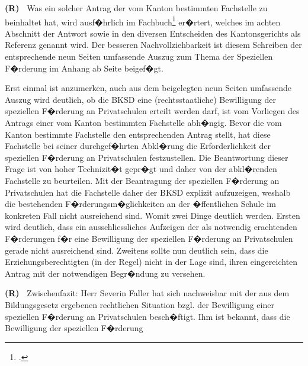 \documentclass[paper=a4,fontsize=12pt, oneside, numbers=noenddot]{scrbook}
\newcounter{rz}
\newcommand{\RzLabel}[1]{\refstepcounter{rz}\label{#1}\textbf{(R\arabic{rz})~}}
\begin{document}
	
	
	\RzLabel{InhaltAntrag} Was ein solcher Antrag der vom Kanton bestimmten Fachstelle zu beinhaltet hat, wird ausf�hrlich im Fachbuch\footcite[Seite 49]{2007:Biaggini:StaatsVerwaltungsrechBL} er�rtert, welches im achten Abschnitt der Antwort sowie in den diversen Entscheiden des Kantonsgerichts als Referenz genannt wird. Der besseren Nachvollziehbarkeit ist diesem Schreiben der entsprechende neun Seiten umfassende Auszug zum Thema der Speziellen F�rderung im Anhang ab Seite \pageref{AuszugVerwaltungsrechtII} beigef�gt. 
	
	
	Erst einmal ist anzumerken, auch aus dem beigelegten neun Seiten umfassende Auszug wird deutlich, ob die BKSD eine (rechtsstaatliche) Bewilligung der speziellen F�rderung an Privatschulen erteilt werden darf, ist vom Vorliegen des Antrags einer vom Kanton bestimmten Fachstelle abh�ngig. Bevor die vom Kanton bestimmte Fachstelle den entsprechenden Antrag stellt, hat diese Fachstelle bei seiner durchgef�hrten Abkl�rung die Erforderlichkeit der speziellen F�rderung an Privatschulen festzustellen. Die Beantwortung dieser Frage ist von hoher Technizit�t gepr�gt und daher von der abkl�renden Fachstelle zu beurteilen. Mit der Beantragung der speziellen F�rderung an Privatschulen hat die Fachstelle daher der BKSD explizit aufzuzeigen, weshalb die bestehenden F�rderungsm�glichkeiten an der �ffentlichen Schule im konkreten Fall nicht ausreichend sind. Womit zwei Dinge deutlich werden. Ersten wird deutlich, dass ein ausschliessliches Aufzeigen der als notwendig erachtenden F�rderungen f�r eine Bewilligung der speziellen F�rderung an Privatschulen gerade nicht ausreichend sind. Zweitens sollte nun deutlich sein, dass die Erziehungsberechtigten (in der Regel) nicht in der Lage sind, ihren eingereichten Antrag mit der notwendigen Begr�ndung zu versehen.
	
	\RzLabel{arg1} Zwischenfazit: Herr Severin Faller hat sich nachweisbar mit der aus dem Bildungsgesetz ergebenen rechtlichen Situation bzgl. der Bewilligung einer speziellen F�rderung an Privatschulen besch�ftigt. Ihm ist bekannt, dass die Bewilligung der speziellen F�rderung
	
\end{document}

